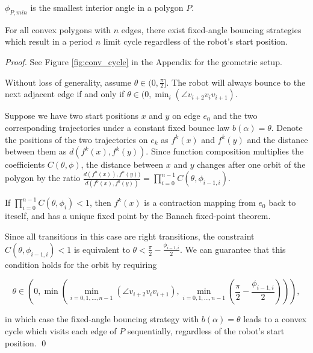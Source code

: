 \documentclass[]{styles/svproc}  %
\begin{document}

\begin{definition}
$\phi_{P,min}$ is the smallest interior angle in a polygon $P$.
\end{definition}

\begin{theorem} \label{thm:convex}
For all convex polygons with $n$ edges, there exist fixed-angle bouncing
strategies which result in a period $n$ limit cycle regardless of the robot's start position.
\end{theorem}
\begin{proof}
See Figure \ref{fig:conv_cycle} in the Appendix for the geometric setup.

Without loss of generality, assume $\theta \in (0, \frac{\pi}{2}]$. The robot will always bounce
to the next adjacent edge if and only if
$\theta \in (0, \min_{i}(\angle v_{i+2}v_{i}v_{i+1})$.

Suppose we have two start positions $x$ and $y$ on edge $e_0$ and the two
corresponding trajectories under a constant fixed bounce law $b(\alpha) = \theta$. Denote the positions of the two trajectories on $e_k$ as $f^{k}(x)$ and
$f^{k}(y)$ and the distance between them as $d(f^{k}(x), f^{k}(y))$. Since function composition multiplies the coefficients $C(\theta, \phi)$, 
the distance between $x$ and $y$ changes after one orbit of the polygon by the
ratio $\frac{d(f^{n}(x)), f^{n}(y))}{d(f^{0}(x), f^{0}(y))} = \prod_{i = 0}^{n-1}
C(\theta, \phi_{i-1, i})$.

If $\prod_{i = 0}^{n-1} C(\theta, \phi_{i}) < 1$, then $f^k(x)$ is a contraction
mapping from $e_0$ back to iteself, and has a unique fixed point by the Banach fixed-point theorem\cite{Granas2003}.

Since all transitions in this case are right transitions, the constraint \\$C(\theta,\phi_{i-1, i})<1$ is equivalent to $\theta < \frac{\pi}{2}-\frac{\phi_{i-1, i}}{2}$. We can guarantee that this condition holds for the orbit by requiring

\begin{equation*}
\theta \in (0, \min(\min_{i = 0, 1, \dots, n-1}(\angle v_{i+2}v_{i}v_{i+1}),
\min_{i = 0, 1, \dots, n-1}(\frac{\pi}{2}-\frac{\phi_{i-1, i}}{2}))),
\end{equation*}

\noindent
in which case the fixed-angle bouncing strategy with $b(\alpha) = \theta$ leads to a convex
cycle which visits each edge of $P$ sequentially, regardless of the robot's start position.
\qed

\end{proof}
\end{document}
